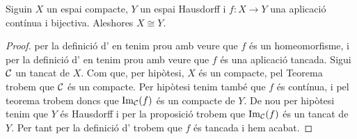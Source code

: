 \documentclass[../../Main.tex]{subfiles}
\begin{document}
	\begin{theorem}
		Siguin \(X\) un espai compacte, \(Y\) un espai Hausdorff i \(f\colon X\longrightarrow Y\) una aplicació contínua i bijectiva. Aleshores \(X\cong Y\).
		\begin{proof}
			per la definició d' en tenim prou amb veure que \(f\) és un homeomorfisme, i per la definició d' en tenim prou amb veure que \(f\) és una aplicació tancada. Sigui \(\mathcal{C}\) un tancat de \(X\). Com que, per hipòtesi, \(X\) és un compacte, pel Teorema  trobem que \(\mathcal{C}\) és un compacte. Per hipòtesi tenim també que \(f\) és contínua, i pel teorema  trobem doncs que \(\operatorname{Im}_{\mathcal{C}}(f)\) és un compacte de \(Y\). De nou per hipòtesi tenim que \(Y\) és Hausdorff i per la proposició  trobem que \(\operatorname{Im}_{\mathcal{C}}(f)\) és un tancat de \(Y\). Per tant per la definició d' trobem que \(f\) és tancada i hem acabat.
		\end{proof}
	\end{theorem}
\end{document}

